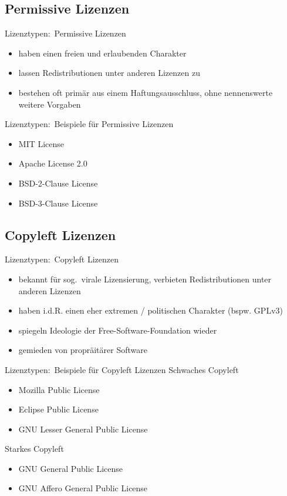 \documentclass{beamer}
\begin{document}
\subsection{Permissive Lizenzen}
\begin{frame}{Lizenztypen:\ Permissive Lizenzen}
	\begin{itemize}
		\item haben einen freien und erlaubenden Charakter
		\item lassen Redistributionen unter anderen Lizenzen zu
		\item bestehen oft primär aus einem Haftungsausschluss, ohne
			nennenswerte weitere Vorgaben
	\end{itemize}
\end{frame}

\begin{frame}{Lizenztypen:\ Beispiele für Permissive Lizenzen}
	\begin{itemize}
		\item MIT License
		\item Apache License 2.0
		\item BSD-2-Clause License
		\item BSD-3-Clause License
	\end{itemize}
\end{frame}

\subsection{Copyleft Lizenzen}
\begin{frame}{Lizenztypen:\ Copyleft Lizenzen}
	\begin{itemize}
		\item bekannt für sog.\ virale Lizensierung,
			verbieten Redistributionen unter anderen Lizenzen
		\item haben i.d.R. einen eher extremen / politischen Charakter (bspw. GPLv3)
		\item spiegeln Ideologie der Free-Software-Foundation wieder
		\item gemieden von propräitärer Software
	\end{itemize}
\end{frame}

\begin{frame}{Lizenztypen:\ Beispiele für Copyleft Lizenzen}
	Schwaches Copyleft
	\vspace{0.5em}
	\begin{itemize}
		\item Mozilla Public License
		\item Eclipse Public License
		\item GNU Lesser General Public License
	\end{itemize}
	\vspace{1em}

	Starkes Copyleft
	\vspace{0.5em}
	\begin{itemize}
		\item GNU General Public License
		\item GNU Affero General Public License
	\end{itemize}
\end{frame}
\end{document}
